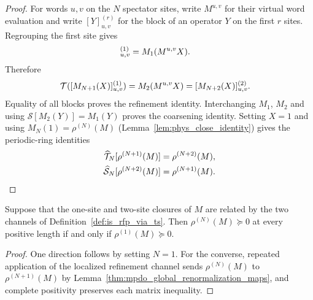 \begin{proof}
    \leanok
    For words $u,v$ on the $N$ spectator sites, write $M^{u,v}$ for their
    virtual word evaluation and write $[Y]^{(r)}_{u,v}$ for the block of an
    operator $Y$ on the first $r$ sites. Regrouping the first site gives
    \begin{align}
        [M_{N+1}(X)]^{(1)}_{u,v}
         & =M_1(M^{u,v}X).
        \notag
    \end{align}
    Therefore
    \begin{align}
        \mathcal T([M_{N+1}(X)]^{(1)}_{u,v})
         & =M_2(M^{u,v}X)
        =[M_{N+2}(X)]^{(2)}_{u,v}.
        \notag
    \end{align}
    Equality of all blocks proves the refinement identity. Interchanging
    $M_1$, $M_2$ and using $\mathcal S[M_2(Y)]=M_1(Y)$ proves the coarsening
    identity. Setting $X=1$ and using
    $M_N(1)=\rho^{(N)}(M)$
    (Lemma~\ref{lem:phys_close_identity}) gives the periodic-ring identities
    \begin{align}
        \widehat{\mathcal T}_N[\rho^{(N+1)}(M)]
         & =\rho^{(N+2)}(M),
        \notag               \\
        \widehat{\mathcal S}_N[\rho^{(N+2)}(M)]
         & =\rho^{(N+1)}(M).
        \notag
    \end{align}
\end{proof}

\begin{lemma}
    \label{thm:mpdo_rfp_one_site_positivity}
    \leanok
    Suppose that the one-site and two-site closures of $M$ are related
    by the two channels of Definition~\ref{def:is_rfp_via_ts}.
    Then $\rho^{(N)}(M)\succeq0$ at every positive length if and only
    if $\rho^{(1)}(M)\succeq0$.
\end{lemma}
\begin{proof}\leanok
    One direction follows by setting $N=1$. For the converse, repeated
    application of the localized refinement channel sends
    $\rho^{(N)}(M)$ to $\rho^{(N+1)}(M)$ by
    Lemma~\ref{thm:mpdo_global_renormalization_maps}, and complete positivity
    preserves each matrix inequality.
\end{proof}

